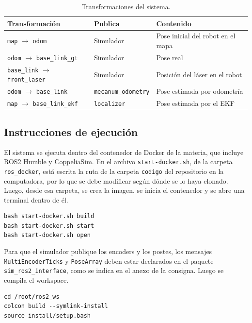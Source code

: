 \documentclass[11pt,a4paper]{article}
\begin{document}
\begin{table}[htbp]
\centering
\small
\begin{tabular}{lll}
\toprule
\textbf{Transformación} & \textbf{Publica} & \textbf{Contenido} \\
\midrule
\texttt{map} $\rightarrow$ \texttt{odom} & Simulador & Pose inicial del robot en el mapa \\
\texttt{odom} $\rightarrow$ \texttt{base\_link\_gt} & Simulador & Pose real \\
\texttt{base\_link} $\rightarrow$ \texttt{front\_laser} & Simulador & Posición del láser en el robot \\
\texttt{odom} $\rightarrow$ \texttt{base\_link} & \texttt{mecanum\_odometry} & Pose estimada por odometría \\
\texttt{map} $\rightarrow$ \texttt{base\_link\_ekf} & \texttt{localizer} & Pose estimada por el EKF \\
\bottomrule
\end{tabular}
\caption{Transformaciones del sistema.}
\label{tab:tf}
\end{table}

\subsection{Instrucciones de ejecución}

El sistema se ejecuta dentro del contenedor de Docker de la materia, que incluye ROS2 Humble y CoppeliaSim. En el archivo \texttt{start-docker.sh}, de la carpeta \texttt{ros\_docker}, está escrita la ruta de la carpeta \texttt{codigo} del repositorio en la computadora, por lo que se debe modificar según dónde se lo haya clonado. Luego, desde esa carpeta, se crea la imagen, se inicia el contenedor y se abre una terminal dentro de él.

\begin{verbatim}
bash start-docker.sh build
bash start-docker.sh start
bash start-docker.sh open
\end{verbatim}

Para que el simulador publique los encoders y los postes, los mensajes \texttt{MultiEncoderTicks} y \texttt{PoseArray} deben estar declarados en el paquete \texttt{sim\_ros2\_interface}, como se indica en el anexo de la consigna. Luego se compila el workspace.

\begin{verbatim}
cd /root/ros2_ws
colcon build --symlink-install
source install/setup.bash
\end{verbatim}
\end{document}

